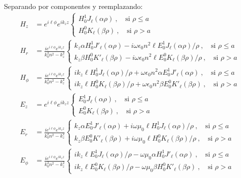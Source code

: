 Separando por componentes y reemplazando:
\begin{align*}
		H_z &=  e^{i\ell\phi}e^{i k_z z}
	  	 \left\{
		\begin{matrix}	  	 
	  	 H_0^1 J_\ell (\alpha \rho) \ , \quad \text{si } \rho \le a  
	  	 \\
	  	 H_0^0 K_\ell (\beta \rho) \ , \quad \text{si } \rho > a  
	  	 \end{matrix}
	  	 \right.	
		\\
	  	 H_r &= \frac{i e^{i\ell\phi}e^{i k_z z} }{k_0^2 n^2 - k_z^2}
	  	 \left\{
		\begin{matrix}	  	 
	  	  k_z \alpha H_0^1 J'_\ell (\alpha \rho) - i\omega \epsilon_0 n^2\ell E_0^1 J_\ell (\alpha \rho)/\rho \ , \quad \text{si } \rho \le a  
	  	 \\
	  	 k_z \beta H_0^0  K'_\ell (\beta \rho) - i\omega \epsilon_0 n^2\ell E_0^0 K_\ell (\beta \rho)/\rho \ , \quad \text{si } \rho > a  
	  	 \end{matrix}
	  	 \right.
	  	 \\
		H_\phi &= \frac{ie^{i\ell\phi} e^{i k_z z}}{k_0^2 n^2 - k_z^2}
		\left\{
		\begin{matrix}
			ik_z\ell H_0^1  J_\ell (\alpha \rho)/\rho + \omega \epsilon_0 n^2  \alpha E_0^1 J'_\ell (\alpha \rho) \ , \quad \text{si } \rho \le a  
			\\
			ik_z \ell H_0^0  K_\ell (\beta \rho)/\rho + \omega \epsilon_0 n^2 \beta E_0^0  K'_\ell (\beta \rho) \ , \quad \text{si } \rho > a  
		\end{matrix}
		\right.
		\\
		E_z &= e^{i\ell\phi} e^{i k_z z}
	  	 \left\{
		\begin{matrix}	  	 
	  	 E_0^1 J_\ell (\alpha \rho) \ , \quad \text{si } \rho \le a  
	  	 \\
	  	 E_0^0 K_\ell (\beta \rho) \ , \quad \text{si } \rho > a  
	  	 \end{matrix}
	  	 \right.	
		\\
	E_r &= \frac{i e^{i\ell\phi} e^{i k_z z} }{k_0^2 n^2 - k_z^2}
	  	 \left\{
		\begin{matrix}	  	 
	  	  k_z \alpha E_0^1 J'_\ell (\alpha \rho)+i\omega \mu_0 \ell H_0^1 J_\ell (\alpha \rho)/\rho \ , \quad \text{si } \rho \le a  
	  	 \\
	  	 k_z \beta E_0^0  K'_\ell (\beta \rho) +i\omega \mu_0 \ell H_0^0 K_\ell (\beta \rho)/\rho \ , \quad \text{si } \rho > a  
	  	 \end{matrix}
	  	 \right.
	\\
	E_\phi &= \frac{i e^{i\ell\phi} e^{i k_z z}}{k_0^2 n^2 - k_z^2}
		\left\{
		\begin{matrix}
			ik_z \ell E_0^1   J_\ell (\alpha \rho)/\rho -\omega \mu_0  \alpha H_0^1  J'_\ell (\alpha \rho) \ , \quad \text{si } \rho \le a  
			\\
			ik_z \ell E_0^0   K_\ell (\beta \rho)/\rho -\omega \mu_0 \beta H_0^0   K'_\ell (\beta \rho) \ , \quad \text{si } \rho > a  
		\end{matrix}
		\right.
\end{align*}
